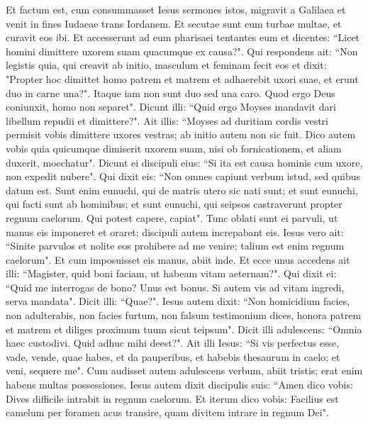 \begin{biblechapter}  
\verse Et factum est, cum consummasset Iesus sermones istos, migravit a Galilaea et venit in fines Iudaeae trans Iordanem. 
\verse Et secutae sunt eum turbae multae, et curavit eos ibi. 
\verse Et accesserunt ad eum pharisaei tentantes eum et dicentes: “Licet homini dimittere uxorem suam quacumque ex causa?". 
\verse Qui respondens ait: “Non legistis quia, qui creavit ab initio, masculum et feminam fecit eos 
\verse et dixit: "Propter hoc dimittet homo patrem et matrem et adhaerebit uxori suae, et erunt duo in carne una?". 
\verse Itaque iam non sunt duo sed una caro. Quod ergo Deus coniunxit, homo non separet". 
\verse Dicunt illi: “Quid ergo Moyses mandavit dari libellum repudii et dimittere?". 
\verse Ait illis: “Moyses ad duritiam cordis vestri permisit vobis dimittere uxores vestras; ab initio autem non sic fuit. 
\verse Dico autem vobis quia quicumque dimiserit uxorem suam, nisi ob fornicationem, et aliam duxerit, moechatur". 
\verse Dicunt ei discipuli eius: “Si ita est causa hominis cum uxore, non expedit nubere". 
\verse Qui dixit eis: “Non omnes capiunt verbum istud, sed quibus datum est. 
\verse Sunt enim eunuchi, qui de matris utero sic nati sunt; et sunt eunuchi, qui facti sunt ab hominibus; et sunt eunuchi, qui seipsos castraverunt propter regnum caelorum. Qui potest capere, capiat". 
\verse Tunc oblati sunt ei parvuli, ut manus eis imponeret et oraret; discipuli autem increpabant eis. 
\verse Iesus vero ait: “Sinite parvulos et nolite eos prohibere ad me venire; talium est enim regnum caelorum". 
\verse Et cum imposuisset eis manus, abiit inde. 
\verse Et ecce unus accedens ait illi: “Magister, quid boni faciam, ut habeam vitam aeternam?". Qui dixit ei: 
\verse “Quid me interrogas de bono? Unus est bonus. Si autem vis ad vitam ingredi, serva mandata". 
\verse Dicit illi: “Quae?". Iesus autem dixit: “Non homicidium facies, non adulterabis, non facies furtum, non falsum testimonium dices, 
\verse honora patrem et matrem et diliges proximum tuum sicut teipsum". 
\verse Dicit illi adulescens: “Omnia haec custodivi. Quid adhuc mihi deest?". 
\verse Ait illi Iesus: “Si vis perfectus esse, vade, vende, quae habes, et da pauperibus, et habebis thesaurum in caelo; et veni, sequere me". 
\verse Cum audisset autem adulescens verbum, abiit tristis; erat enim habens multas possessiones. 
\verse Iesus autem dixit discipulis suis: “Amen dico vobis: Dives difficile intrabit in regnum caelorum. 
\verse Et iterum dico vobis: Facilius est camelum per foramen acus transire, quam divitem intrare in regnum Dei". 

\end{biblechapter}
